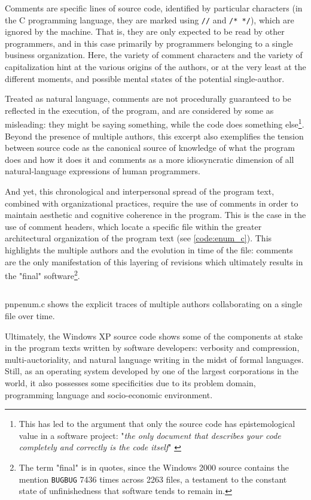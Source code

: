 Comments are specific lines of source code, identified by particular characters (in the C programming language, they are marked using \lstinline{//} and \lstinline{/* */}), which are ignored by the machine. That is, they are only expected to be read by other programmers, and in this case primarily by programmers belonging to a single business organization. Here, the variety of comment characters and the variety of capitalization hint at the various origins of the authors, or at the very least at the different moments, and possible mental states of the potential single-author.

Treated as natural language, comments are not procedurally guaranteed to be reflected in the execution, of the program, and are considered by some as misleading: they might be saying something, while the code does something else\footnote{This has led to the argument that only the source code has epistemological value in a software project: "\emph{the only document that describes your code completely and correctly is the code itself}" \citep{goodliffe_code_2007}}. Beyond the presence of multiple authors, this excerpt also exemplifies the tension between source code as the canonical source of knowledge of what the program does and how it does it and comments as a more idiosyncratic dimension of all natural-language expressions of human programmers.

And yet, this chronological and interpersonal spread of the program text, combined with organizational practices, require the use of comments in order to maintain aesthetic and cognitive coherence in the program. This is the case in the use of comment headers, which locate a specific file within the greater architectural organization of the program text (see \ref{code:enum_c}). This highlights the multiple authors and the evolution in time of the file: comments are the only manifestation of this layering of revisions which ultimately results in the "final" software\footnote{The term "final" is in quotes, since the Windows 2000 source contains the mention \lstinline{BUGBUG} 7436 times across 2263 files, a testament to the constant state of unfinishedness that software tends to remain in.}.

\begin{listing}
  \inputminted{c}{./corpus/enum.c}
  \caption{pnpenum.c shows the explicit traces of multiple authors collaborating on a single file over time.}
  \label{code:enum_c}
\end{listing}

Ultimately, the Windows XP source code shows some of the components at stake in the program texts written by software developers: verbosity and compression, multi-auctoriality, and natural language writing in the midst of formal languages. Still, as an operating system developed by one of the largest corporations in the world, it also possesses some specificities due to its problem domain, programming language and socio-economic environment.

